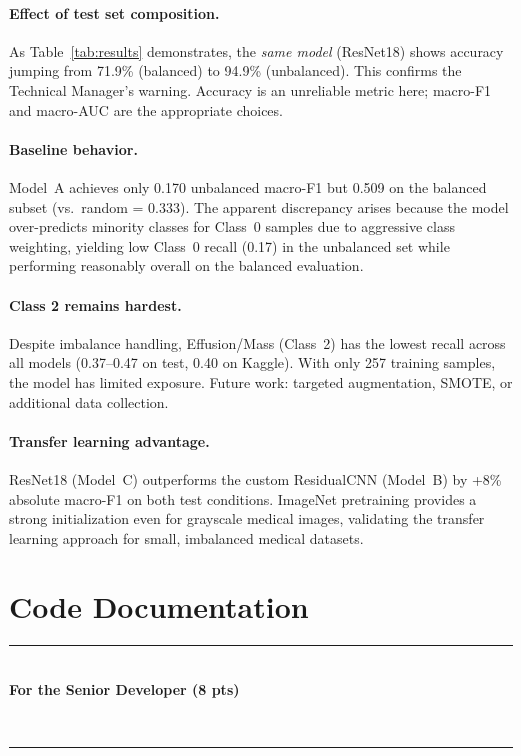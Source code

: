 \documentclass[11pt, letterpaper]{article}
\begin{document}
\paragraph{Effect of test set composition.}
As Table~\ref{tab:results} demonstrates, the \emph{same model} (ResNet18) shows
accuracy jumping from 71.9\% (balanced) to 94.9\% (unbalanced). This confirms
the Technical Manager's warning. Accuracy is an unreliable metric here;
macro-F1 and macro-AUC are the appropriate choices.

\paragraph{Baseline behavior.}
Model~A achieves only 0.170 unbalanced macro-F1 but 0.509 on the balanced subset
(vs.\ random = 0.333). The apparent discrepancy arises because the model
over-predicts minority classes for Class~0 samples due to aggressive class
weighting, yielding low Class~0 recall (0.17) in the unbalanced set while
performing reasonably overall on the balanced evaluation.

\paragraph{Class 2 remains hardest.}
Despite imbalance handling, Effusion/Mass (Class~2) has the lowest recall
across all models (0.37--0.47 on test, 0.40 on Kaggle). With only 257
training samples, the model has limited exposure. Future work: targeted
augmentation, SMOTE, or additional data collection.

\paragraph{Transfer learning advantage.}
ResNet18 (Model~C) outperforms the custom ResidualCNN (Model~B) by
+8\% absolute macro-F1 on both test conditions. ImageNet pretraining provides
a strong initialization even for grayscale medical images, validating the
transfer learning approach for small, imbalanced medical datasets.

\newpage
\section{Code Documentation}
\label{sec:developer}
{\color{devcolor}\rule{\linewidth}{1.5pt}\\
\textbf{For the Senior Developer (8 pts)}}\\[-0.5em]
{\color{devcolor}\rule{\linewidth}{0.5pt}}
\end{document}
